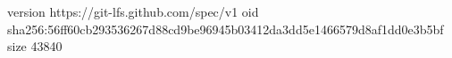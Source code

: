 version https://git-lfs.github.com/spec/v1
oid sha256:56ff60cb293536267d88cd9be96945b03412da3dd5e1466579d8af1dd0e3b5bf
size 43840
